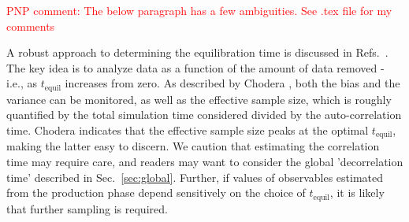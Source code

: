 \textcolor{red}{PNP comment: The below paragraph has a few ambiguities. See .tex file for my comments}

A robust approach to determining the equilibration time is discussed in Refs.\ \cite{Yang2004,Chodera-2016}.
The key idea is to analyze data as a function of the amount of data removed - i.e., as $t_{\mathrm{equil}}$ increases from zero.  As described by Chodera \cite{Chodera-2016}, both the bias and the variance can be monitored, as well as the effective sample size, which is roughly quantified by the total simulation time considered divided by the auto-correlation time.
Chodera indicates that the effective sample size peaks at the optimal $t_{\mathrm{equil}}$, making the latter easy to discern.
We caution that estimating the correlation time may require care, and readers may want to consider the global 'decorrelation time' \cite{Lyman2007a} described in Sec.\ \ref{sec:global}.  Further, if values of observables estimated from the production phase depend sensitively on the choice of $t_{\mathrm{equil}}$, it is likely that further sampling is required.


